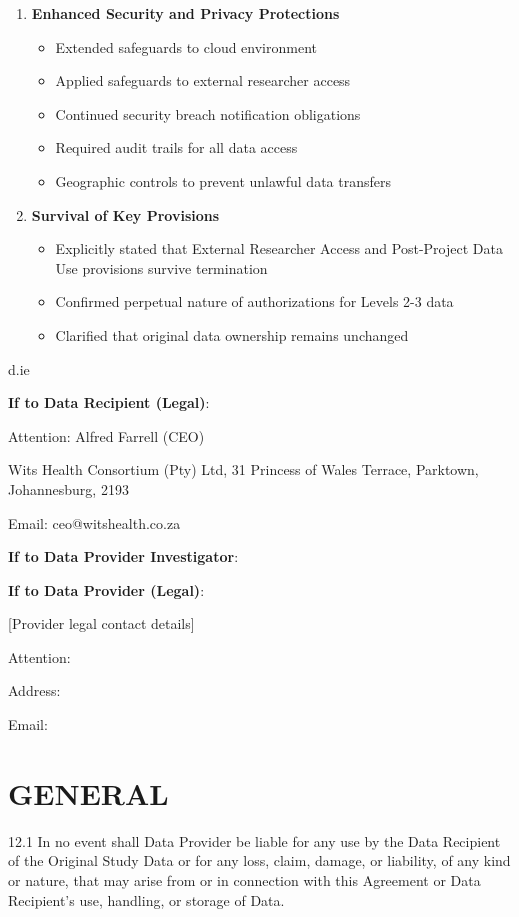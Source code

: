 {\begin{enumerate}
\begin{enumerate}
\item \textbf{Enhanced Security and Privacy Protections}
   \begin{itemize}
   \item Extended safeguards to cloud environment
   \item Applied safeguards to external researcher access
   \item Continued security breach notification obligations
   \item Required audit trails for all data access
   \item Geographic controls to prevent unlawful data transfers
   \end{itemize}

\item \textbf{Survival of Key Provisions}
   \begin{itemize}
   \item Explicitly stated that External Researcher Access and Post-Project Data Use provisions survive termination
   \item Confirmed perpetual nature of authorizations for Levels 2-3 data
   \item Clarified that original data ownership remains unchanged
   \end{itemize}
\end{enumerate}

d.ie

\textbf{If to Data Recipient (Legal)}:

Attention: Alfred Farrell (CEO)

Wits Health Consortium (Pty) Ltd, 31 Princess of Wales Terrace, Parktown, Johannesburg, 2193

Email: ceo@witshealth.co.za

\textbf{If to Data Provider Investigator}:

\textbf{If to Data Provider (Legal)}:

[Provider legal contact details]

Attention:

Address:

Email:

\section{GENERAL}

12.1 In no event shall Data Provider be liable for any use by the Data Recipient of the Original Study Data or for any loss, claim, damage, or liability, of any kind or nature, that may arise from or in connection with this Agreement or Data Recipient's use, handling, or storage of Data.


\end{enumerate}}
